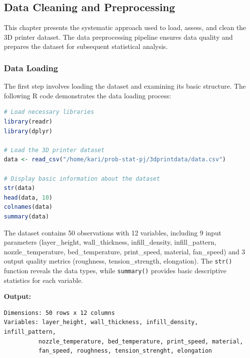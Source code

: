 
\subsection{Data Cleaning and Preprocessing}

This chapter presents the systematic approach used to load, assess, and clean the 3D printer dataset. The data preprocessing pipeline ensures data quality and prepares the dataset for subsequent statistical analysis.

\subsubsection{Data Loading}

The first step involves loading the dataset and examining its basic structure. The following R code demonstrates the data loading process:

\begin{lstlisting}[language=R, caption={Data Loading and Initial Exploration}, label={lst:data_load}]
# Load necessary libraries
library(readr)
library(dplyr)

# Load the 3D printer dataset
data <- read_csv("/home/kari/prob-stat-pj/3dprintdata/data.csv")

# Display basic information about the dataset
str(data)
head(data, 10)
colnames(data)
summary(data)
\end{lstlisting}

The dataset contains 50 observations with 12 variables, including 9 input parameters (layer\_height, wall\_thickness, infill\_density, infill\_pattern, nozzle\_temperature, bed\_temperature, print\_speed, material, fan\_speed) and 3 output quality metrics (roughness, tension\_strength, elongation). The \texttt{str()} function reveals the data types, while \texttt{summary()} provides basic descriptive statistics for each variable.

\textbf{Output:}
\begin{verbatim}
Dimensions: 50 rows x 12 columns
Variables: layer_height, wall_thickness, infill_density, infill_pattern, 
          nozzle_temperature, bed_temperature, print_speed, material, 
          fan_speed, roughness, tension_strenght, elongation
\end{verbatim}

